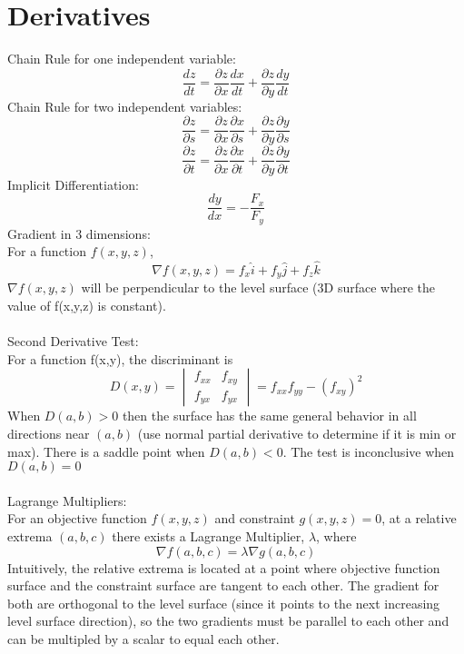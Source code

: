 \documentclass{article}
\begin{document}
\section{Derivatives}
Chain Rule for one independent variable:
$$\frac{dz}{dt} = \frac{\partial z}{\partial x} \frac{dx}{dt} + \frac{\partial z}{\partial y} \frac{dy}{dt}$$
Chain Rule for two independent variables:
$$\frac{\partial z}{\partial s} = \frac{\partial z}{\partial x} \frac{\partial x}{\partial s} + \frac{\partial z}{\partial y}\frac{\partial y}{\partial s}$$
$$\frac{\partial z}{\partial t} = \frac{\partial z}{\partial x} \frac{\partial x}{\partial t} + \frac{\partial z}{\partial y}\frac{\partial y}{\partial t}$$
Implicit Differentiation: 
$$\frac{dy}{dx} = -\frac{F_x}{F_y}$$
Gradient in 3 dimensions:
\\For a function $f(x,y,z)$,
$$\nabla f(x,y,z) = f_x \hat{i} + f_y \hat{j} + f_z \hat{k}$$
$\nabla f(x,y,z)$ will be perpendicular to the level surface (3D surface where the value of f(x,y,z) is constant).
\\
\\Second Derivative Test:
\\For a function f(x,y), the discriminant is
$$D(x,y) = \begin{vmatrix} 
    f_{xx} & f_{xy} \\ f_{yx} & f_{yx}
    \end{vmatrix} = f_{xx} f_{yy} - (f_{xy} )^2$$
When $D(a,b) > 0$ then the surface has the same general behavior in all directions near $(a,b)$ (use normal partial derivative to determine if it is min or max). There is a saddle point when $D(a,b) < 0$. The test is inconclusive when $D(a,b) = 0$ 
\\
\\
Lagrange Multipliers:
\\For an objective function $f(x,y,z)$ and constraint $g(x,y,z) = 0$, at a relative extrema $(a,b,c)$ there exists a Lagrange Multiplier, $\lambda$, where
$$\nabla f(a,b,c) = \lambda \nabla g(a,b,c)$$
Intuitively, the  relative extrema is located at a point where objective function surface and the constraint surface are tangent to each other. The gradient for both are orthogonal to the level surface (since it points to the next increasing level surface direction), so the two gradients must be parallel to each other and can be multipled by a scalar to equal each other.   
\end{document}
